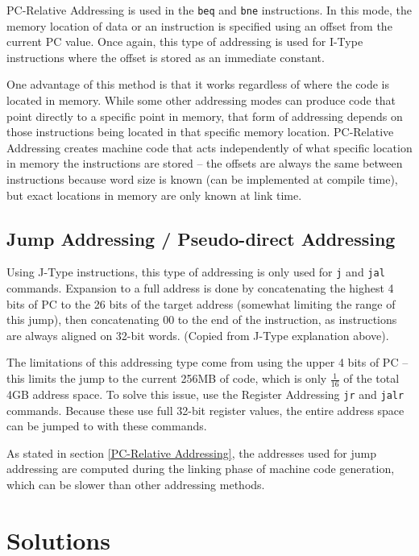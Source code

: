\documentclass{article}
\begin{document}
PC-Relative Addressing is used in the \texttt{beq} and \texttt{bne} instructions. In this mode, the memory location of data or an instruction is specified using an offset from the current PC value. Once again, this type of addressing is used for I-Type instructions where the offset is stored as an immediate constant. 

One advantage of this method is that it works regardless of where the code is located in memory. While some other addressing modes can produce code that point directly to a specific point in memory, that form of addressing depends on those instructions being located in that specific memory location. PC-Relative Addressing creates machine code that acts independently of what specific location in memory the instructions are stored -- the offsets are always the same between instructions because word size is known (can be implemented at compile time), but exact locations in memory are only known at link time.


\subsection{Jump Addressing / Pseudo-direct Addressing}\label{Jump Addressing}

Using J-Type instructions, this type of addressing is only used for \texttt{j} and \texttt{jal} commands. Expansion to a full address is done by concatenating the highest 4 bits of PC to the 26 bits of the target address (somewhat limiting the range of this jump), then concatenating 00 to the end of the instruction, as instructions are always aligned on 32-bit words. (Copied from J-Type explanation above).

The limitations of this addressing type come from using the upper 4 bits of PC -- this limits the jump to the current 256MB of code, which is only $\frac{1}{16}$ of the total 4GB address space. To solve this issue, use the Register Addressing \texttt{jr} and \texttt{jalr} commands. Because these use full 32-bit register values, the entire address space can be jumped to with these commands. 

As stated in section \ref{PC-Relative Addressing}, the addresses used for jump addressing are computed during the linking phase of machine code generation, which can be slower than other addressing methods. 


\section{Solutions}
\end{document}
